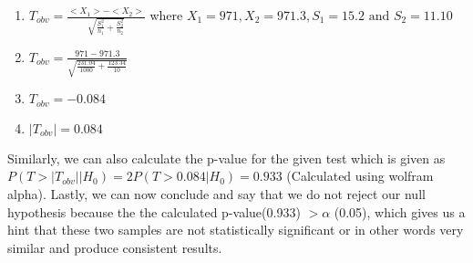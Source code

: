 \begin{enumerate}
    \item $T_{obv} = \frac{<X_1> - <X_2>}{\sqrt{\frac{S_1^2}{n_1} + \frac{S_2^2}{n_2}}}$ where $X_1 = 971, X_2 = 971.3, S_1 = 15.2 \text{ and } S_2 = 11.10$ 
    \item $T_{obv} = \frac{971 - 971.3}{\sqrt{\frac{231.04}{1000} + \frac{123.34}{10}}}$
    \item $T_{obv} = - 0.084$
    \item $|T_{obv}| = 0.084$
\end{enumerate}
Similarly, we can also calculate the p-value for the given test which is given as $P(T > |T_{obv}| | H_0) = 2P(T > 0.084 | H_0) = 0.933 $ (Calculated using wolfram alpha). Lastly, we can now conclude and say that we do not reject our null hypothesis because the the calculated p-value(0.933)  $> \alpha$ (0.05), which gives us a hint that these two samples are not statistically significant or in other words very similar and produce consistent results.
